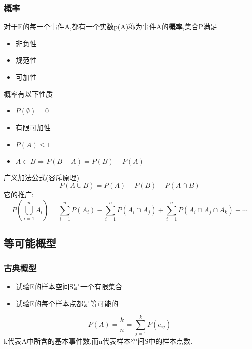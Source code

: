\documentclass{ctexart}
\begin{document}
\subsubsection{概率}
对于E的每一个事件A,都有一个实数p(A)称为事件A的\textbf{概率},集合P满足
\begin{itemize}
	\item 非负性
	\item 规范性
	\item 可加性
\end{itemize}
概率有以下性质
\begin{itemize}
	\item $P(\emptyset)=0$
	\item 有限可加性
	\item $P(A)\leq 1$
	\item $A \subset B\Rightarrow P(B-A)=P(B)-P(A)$
\end{itemize}
广义加法公式(容斥原理)
\begin{equation}
    P(A\cup B)=P(A)+P(B)-P(A\cap B)
\end{equation}
它的推广:
\begin{equation}
    P(\bigcup_{i=1}^nA_i)=\sum_{i=1}^nP(A_i)-\sum_{i=1}^nP(A_i\cap A_j)+\sum_{i=1}^nP(A_i\cap A_j\cap A_k)-\cdots
\end{equation}
\subsection{等可能概型}
\subsubsection{古典概型}
\begin{itemize}
    \item 试验E的样本空间S是一个有限集合
    \item 试验E的每个样本点都是等可能的
\end{itemize}
\begin{equation}
    P(A)=\frac{k}{n}=\sum_{j=1}^kP({e_{ij}})
\end{equation}
k代表A中所含的基本事件数,而n代表样本空间S中的样本点数.\\
\
\end{document}
